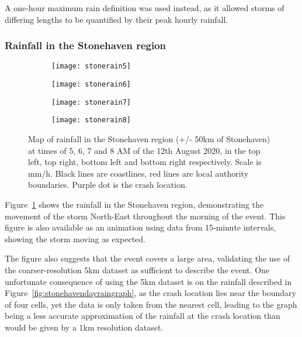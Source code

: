 A one-hour maximum rain definition was used instead,
    as it allowed storms of differing lengths to be quantified by their peak hourly rainfall.

\subsubsection{Rainfall in the Stonehaven region}

\begin{figure}[H]
    \centering

    \begin{subfigure}{0.48\textwidth}
        \centering
        \texttt{[image: stonerain5]}
    \end{subfigure}
    \hfill
    \begin{subfigure}{0.48\textwidth}
        \centering
        \texttt{[image: stonerain6]}
    \end{subfigure}

    \vspace{\baselineskip}

    \begin{subfigure}{0.48\textwidth}
        \centering
        \texttt{[image: stonerain7]}
    \end{subfigure}
    \hfill
    \begin{subfigure}{0.48\textwidth}
        \centering
        \texttt{[image: stonerain8]}
    \end{subfigure}
    \caption[Map of rainfall in the Stonehaven region at times in the morning of 12th August 2020.]{
        Map of rainfall in the Stonehaven region (+/- 50km of Stonehaven)
        at times of 5, 6, 7 and 8 AM of the 12th August 2020,
        in the top left, top right, bottom left and bottom right respectively.
    Scale is mm/h.
    Black lines are coastlines, red lines are local authority boundaries.
    Purple dot is the crash location.}
    \label{fig:stoneregionrain}
\end{figure}

Figure~\ref{fig:stoneregionrain} shows the rainfall in the Stonehaven region,
    demonstrating the movement of the storm North-East throughout the morning of the event.
This figure is also available as an animation using data from 15-minute intervals,
    showing the storm moving as expected.

The figure also suggests that the event covers a large area,
    validating the use of the coarser-resolution 5km dataset as sufficient to describe the event.
One unfortunate consequence of using the 5km dataset is on the rainfall described in Figure~\ref{fig:stonehavendayraingraph},
    as the crash location lies near the boundary of four cells, yet the data is only taken from the nearest cell,
    leading to the graph being a less accurate approximation of the rainfall at the crash location than would be given by a 1km resolution dataset.

